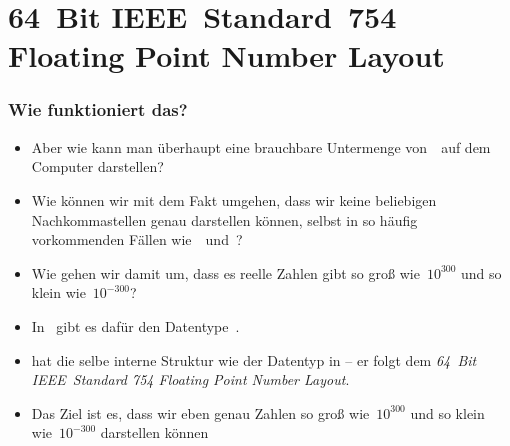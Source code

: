 \documentclass[aspectratio=169,mathserif,notheorems]{beamer}%
\begin{document}
\section{64~Bit IEEE~Standard~754 Floating Point Number Layout}%
%
\begin{frame}%
\frametitle{Wie funktioniert das?}%
\begin{itemize}%
\item Aber wie kann man überhaupt eine brauchbare Untermenge von~\realNumbers\ auf dem Computer darstellen?%
\item<2-> Wie können wir mit dem Fakt umgehen, dass wir keine beliebigen Nachkommastellen genau darstellen können, selbst in so häufig vorkommenden Fällen wie~\numberPi\ und~\numberE?%
\item<3-> Wie gehen wir damit um, dass es reelle Zahlen gibt so groß wie~$10^{300}$ und so klein wie~$10^{-300}$?%
\item<4-> In \python\ gibt es dafür den Datentype~.%
\item<5->  hat die selbe interne Struktur wie der Datentyp  in \cite{PSF:P3D:TPSL:NTIFC} -- er folgt dem \emph{64~Bit IEEE~Standard 754 Floating Point Number Layout}\cite{IEEE2019ISFFPA,H1997IS7FPN}.%
\item<6-> Das Ziel ist es, dass wir eben genau Zahlen so groß wie~$10^{300}$ und so klein wie~$10^{-300}$ darstellen können%
\end{itemize}%
\end{frame}%
\end{document}
